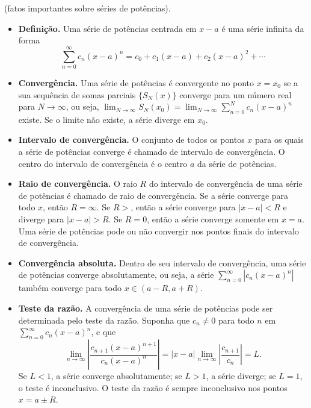 \documentclass{article}
\begin{document}
\begin{rem} (fatos importantes sobre séries de potências).
    \begin{itemize}
        \item \textbf{Definição.} Uma série de potências centrada em \(x-a\) é uma série infinita da forma \begin{equation}\sum_{n=0}^{\infty} c_n (x-a)^n = c_0 + c_1(x-a) + c_2(x-a)^2 + \cdots\end{equation}
        \item \textbf{Convergência.} Uma série de potências é convergente no ponto \(x=x_0\) se a sua sequência de somas parciais \(\{S_N(x)\}\) converge para um número real para \(N\to\infty\), ou seja, \(\lim_{N\to\infty} S_N(x_0) = \lim_{N\to\infty} \sum_{n=0}^{N} c_n (x-a)^n\) existe. Se o limite não existe, a série diverge em \(x_0\).
        \item \textbf{Intervalo de convergência.} O conjunto de todos os pontos \(x\) para os quais a série de potências converge é chamado de intervalo de convergência. O centro do intervalo de convergência é o centro \(a\) da série de potências.
        \item \textbf{Raio de convergência.} O raio \(R\) do intervalo de convergência de uma série de potências é chamado de raio de convergência. Se a série converge para todo \(x\), então \(R=\infty\). Se \(R>\), então a série converge para \(|x-a|<R\) e diverge para \(|x-a|>R\). Se \(R=0\), então a série converge somente em \(x=a\). Uma série de potências pode ou não convergir nos pontos finais do intervalo de convergência.
        \item \textbf{Convergência absoluta.} Dentro de seu intervalo de convergência, uma série de potências converge absolutamente, ou seja, a série \(\sum_{n=0}^{\infty} |c_n (x-a)^n|\) também converge para todo \(x \in (a-R, a+R)\).
        \item \textbf{Teste da razão.} A convergência de uma série de potências pode ser determinada pelo teste da razão. Suponha que \(c_n\neq0\) para todo \(n\) em \(\sum_{n=0}^{\infty} c_n (x-a)^n\), e que 
        \begin{equation}
            \lim_{n\to\infty} \left| \frac{c_{n+1}(x-a)^{n+1}}{c_n (x-a)^n} \right| = |x-a| \lim_{n\to\infty} \left| \frac{c_{n+1}}{c_n} \right| = L.
        \end{equation}
        \noindent Se \(L<1\), a série converge absolutamente; se \(L>1\), a série diverge; se \(L=1\), o teste é inconclusivo. O teste da razão é sempre inconclusivo nos pontos \(x=a\pm R\).

\end{itemize}
\end{rem}
\end{document}
